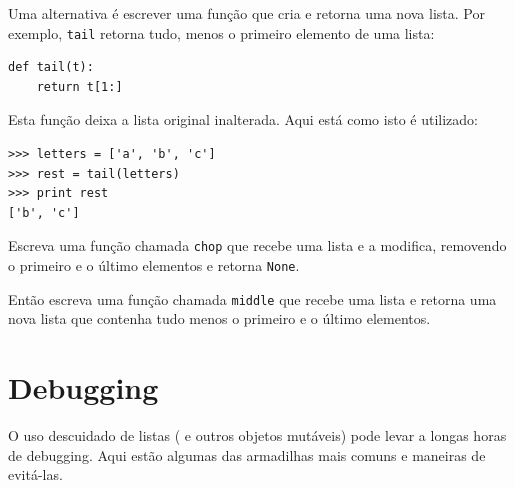 



Uma alternativa é escrever uma função que cria e retorna uma nova lista.
Por exemplo, {\tt tail} retorna tudo, menos o primeiro elemento de uma lista: 


\beforeverb
\begin{verbatim}
def tail(t):
    return t[1:]
\end{verbatim}
\afterverb
%
Esta função deixa a lista original inalterada.
Aqui está como isto é utilizado:


\beforeverb
\begin{verbatim}
>>> letters = ['a', 'b', 'c']
>>> rest = tail(letters)
>>> print rest
['b', 'c']
\end{verbatim}
\afterverb


\begin{ex}

Escreva uma função chamada {\tt chop} que recebe uma lista e a modifica,
removendo o primeiro e o último elementos e retorna {\tt None}.

Então escreva uma função chamada {\tt middle} que recebe uma lista e retorna
uma nova lista que contenha tudo menos o primeiro e o último elementos.



\end{ex}


\section{Debugging}

O uso descuidado de listas ( e outros objetos mutáveis) 
pode levar a longas horas de debugging. Aqui estão algumas das
armadilhas mais comuns e maneiras de evitá-las.


